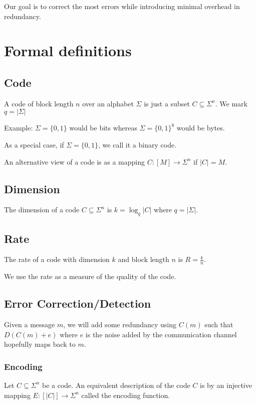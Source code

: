 \documentclass{idc_msc}
\begin{document}
Our goal is to correct the most errors while introducing minimal overhead in redundancy.

\section{Formal definitions}

\subsection{Code}

A code of block length $n$ over an alphabet $\Sigma$ is just a subset $C \subseteq \Sigma^n$. We mark $q=|\Sigma|$

Example: $\Sigma = \{0,1\}$ would be bits whereas $\Sigma = \{0,1\}^8$ would be bytes.

As a special case, if $\Sigma = \{0,1\}$, we call it a binary code.

An alternative view of a code is as a mapping $C : [M] \to \Sigma^n$ if $|C| = M$.

\subsection{Dimension}

The dimension of a code $C \subseteq \Sigma^n$ is $k = \log_q{|C|}$ where $q=|\Sigma|$.

\subsection{Rate}

The rate of a code with dimension $k$ and block length $n$ is $R = \frac{k}{n}$.

We use the rate as a measure of the quality of the code.

\subsection{Error Correction/Detection}

Given a message $m$, we will add some redundancy using $C(m)$ such that $D(C(m) + e)$ where $e$ is the noise added by the communication channel hopefully maps back to $m$.

\subsubsection{Encoding}

Let $C \subseteq \Sigma^n$ be a code. An equivalent description of the code $C$ is by an injective mapping $E : [|C|] \to \Sigma^n$ called the encoding function.
\end{document}
